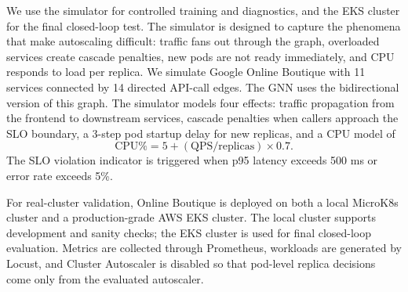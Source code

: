 We use the simulator for controlled training and diagnostics, and the EKS
cluster for the final closed-loop test.  The simulator is designed to
capture the phenomena that make autoscaling difficult: traffic fans out
through the graph, overloaded services create cascade penalties, new pods
are not ready immediately, and CPU responds to load per replica.  We
simulate Google Online Boutique with 11 services connected by 14 directed
API-call edges.  The GNN uses the bidirectional version of this graph.
The simulator models four effects: traffic propagation from the frontend
to downstream services, cascade penalties when callers approach the SLO
boundary, a 3-step pod startup delay for new replicas, and a CPU model of
\[
\text{CPU\%}=5+(\text{QPS}/\text{replicas})\times 0.7.
\]
The SLO violation indicator is triggered when p95 latency exceeds 500 ms
or error rate exceeds 5\%.

For real-cluster validation, Online Boutique is deployed on both a local
MicroK8s cluster and a production-grade AWS EKS cluster.  The local
cluster supports development and sanity checks; the EKS cluster is used
for final closed-loop evaluation.  Metrics are collected through
Prometheus, workloads are generated by Locust, and Cluster Autoscaler is
disabled so that pod-level replica decisions come only from the evaluated
autoscaler.

